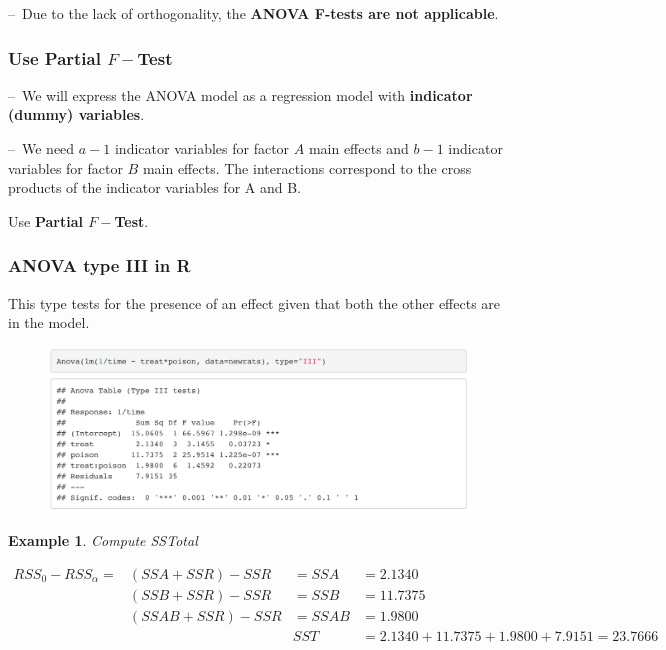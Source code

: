 \documentclass[11pt,a4paper]{article}
\newtheorem{example}{Example}
\begin{document}
–\ Due to the lack of orthogonality, the \textbf{ANOVA F-tests are not applicable}.

\subsubsection{ Use \textbf{Partial $F-$Test}}
–\ We will express the ANOVA model as a regression model with \textbf{indicator (dummy) variables}.

–\ We need $a-1$ indicator variables for factor $A$ main effects and $b-1$ indicator variables for factor $B$ main effects. The interactions correspond to the cross products of the indicator variables for A and B.

Use \textbf{Partial $F-$Test}.

\subsubsection{ANOVA type III in R}
This type tests for the presence of an eﬀect given that both the other eﬀects are in the model.
\begin{center}\begin{figure}[htbp]
    \centering
    \includegraphics[scale=0.3]{type3}
    \caption{}
    \label{}
\end{figure}\end{center}
\begin{example}
Compute SSTotal
\end{example}
\begin{equation}
    \begin{aligned}
        {RSS}_0-{RSS}_\alpha=&(SSA+SSR)-SSR&=SSA&=2.1340\\
        &(SSB+SSR)-SSR&=SSB&=11.7375\\
        &(SSAB+SSR)-SSR&=SSAB&=1.9800\\
        &	&SST&=2.1340+11.7375+1.9800+7.9151=23.7666
    \end{aligned}
    \nonumber
\end{equation}
\end{document}
